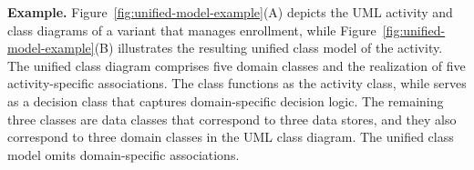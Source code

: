 \noindent\textbf{Example.} 
Figure~\ref{fig:unified-model-example}(A) depicts the UML activity and class diagrams of a \courseman variant that manages enrollment, while Figure~\ref{fig:unified-model-example}(B) illustrates the resulting unified class model of the activity. The unified class diagram comprises five domain classes and the realization of five activity-specific associations. The  class functions as the activity class, while  serves as a decision class that captures domain-specific decision logic. The remaining three classes are data classes that correspond to three data stores, and they also correspond to three domain classes in the UML class diagram. The unified class model omits domain-specific associations.


